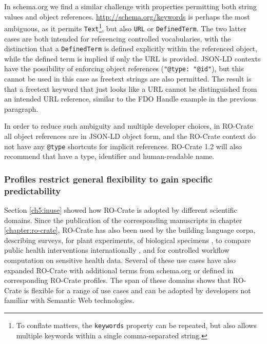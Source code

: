 In schema.org we find a similar challenge with properties permitting both string values and object references. \url{http://schema.org/keywords} is perhaps the most ambiguous, as it permits \texttt{Text}\footnote{To conflate matters, the \texttt{keywords} property can be repeated, but also allows multiple keywords within a single comma-separated string.}, but also \texttt{URL} or \texttt{DefinedTerm}.
The two latter cases are both intended for referencing controlled vocabularies, with the distinction that a \texttt{DefinedTerm} is defined explicitly within the referenced object, while the defined term is implied if only the URL is provided.
JSON-LD contexts have the possibility of enforcing object references (\texttt{"@type: "@id"}), but this cannot be used in this case as freetext strings are also permitted.
The result is that a freetext keyword that just looks like a URL cannot be distinguished from an intended URL reference, similar to the FDO Handle example in the previous paragraph.

In order to reduce such ambiguity and multiple developer choices, in RO-Crate all object references are in JSON-LD object form, and the RO-Crate context do not have any \texttt{@type} shortcuts for implicit references.
RO-Crate 1.2 will also recommend that  have a type, identifier and human-readable name. 


\subsubsection{Profiles restrict general flexibility to gain specific predictability}\label{ch60:profiles}

Section \vref{ch5:inuse} showed how RO-Crate is adopted by different scientific domains. 
Since the publication of the corresponding manuscripts in chapter \ref{chapter:ro-crate}, RO-Crate has also been used by the  \cite{LREC2022} building language corpa,  \cite{surveyOntology} describing surveys,  for plant experiments,  of biological specimens \cite{Wittner 2020,Wittner 2023,Wittner 2023b},  to compare public health interventions internationally , and  for controlled workflow computation on sensitive health data. Several of these use cases have also expanded RO-Crate with additional terms from schema.org or defined in corresponding RO-Crate profiles. The span of these domains shows that RO-Crate is flexible for a range of use cases and can be adopted by developers not familiar with Semantic Web technologies.

